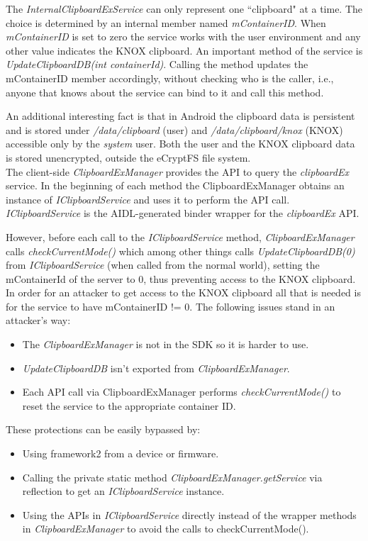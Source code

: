 \documentclass[11pt]{article}
\begin{document}
The \emph{InternalClipboardExService} can only represent one ``clipboard" at a time. The choice is determined by 
an internal member named \emph{mContainerID}. When \emph{mContainerID} is set to zero the service works with the user environment and 
any other value indicates the KNOX clipboard.
An important method of the service is \emph{UpdateClipboardDB(int containerId)}. Calling the method updates the mContainerID member accordingly, 
without checking who is the caller, i.e., anyone that knows about the service can bind to it and call this method. 

An additional interesting fact is that in Android the clipboard data is persistent and is stored under 
\emph{/data/clipboard} (user) and \emph{/data/clipboard/knox} (KNOX) accessible only by the \emph{system} user.
Both the user and the KNOX clipboard data is stored unencrypted, outside the eCryptFS file system. \\

The client-side \emph{ClipboardExManager} provides the API to query the \emph{clipboardEx} service.
In the beginning of each method the ClipboardExManager obtains an instance of \emph{IClipboardService} and uses it to perform the API call. 
\emph{IClipboardService} is the AIDL-generated binder wrapper for the \emph{clipboardEx} API.

However, before each call to the \emph{IClipboardService} method, \emph{ClipboardExManager} calls \emph{checkCurrentMode()} which 
among other things calls \emph{UpdateClipboardDB(0)} from \emph{IClipboardService} (when called from the normal world), setting the mContainerId 
of the server to 0, thus preventing access to the KNOX clipboard. \\

In order for an attacker to get access to the KNOX clipboard all that is needed is for the service to have mContainerID != 0.
The following issues stand in an attacker's way:
\begin{itemize} \setlength{\itemsep}{0pt}
\item The \emph{ClipboardExManager} is not in the SDK so it is harder to use.
\item \emph{UpdateClipboardDB} isn't exported from \emph{ClipboardExManager}.
\item Each API call via ClipboardExManager performs \emph{checkCurrentMode()} to reset the service to the appropriate container ID.
\end{itemize} 

\noindent These protections can be easily bypassed by:
\begin{itemize} \setlength{\itemsep}{0pt}
\item Using framework2 from a device or firmware.
\item Calling the private static method \emph{ClipboardExManager.getService} via reflection to get an \emph{IClipboardService} instance.
\item Using the APIs in \emph{IClipboardService} directly instead of the wrapper methods in \emph{ClipboardExManager} to avoid the calls to checkCurrentMode().
\end{itemize}
\end{document}
